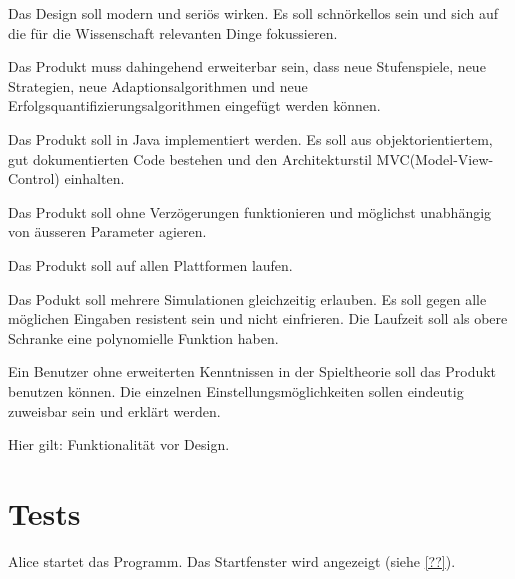 \documentclass[parskip=full,11pt]{scrartcl}
\begin{document}

Das Design soll modern und seriös wirken. Es soll schnörkellos sein und sich auf die für die Wissenschaft relevanten Dinge fokussieren.


Das Produkt muss dahingehend erweiterbar sein,
dass neue Stufenspiele, neue Strategien, neue Adaptionsalgorithmen und neue Erfolgsquantifizierungsalgorithmen eingefügt werden können.


Das Produkt soll in Java implementiert werden. Es soll aus objektorientiertem, gut dokumentierten Code bestehen und den Architekturstil MVC(Model-View-Control) einhalten.


Das Produkt soll ohne Verzögerungen funktionieren und möglichst unabhängig von äusseren Parameter agieren.


Das Produkt soll auf allen Plattformen laufen.


Das Podukt soll mehrere Simulationen gleichzeitig erlauben. Es soll gegen alle möglichen Eingaben resistent sein und nicht einfrieren.
Die Laufzeit soll als obere Schranke eine polynomielle Funktion haben.


Ein Benutzer ohne erweiterten Kenntnissen in der Spieltheorie soll das Produkt benutzen können.
Die einzelnen Einstellungsmöglichkeiten sollen eindeutig zuweisbar sein und erklärt werden. 

Hier gilt: Funktionalität vor Design. 

\section{Tests}


{Alice startet das Programm.}
{Das Startfenster wird angezeigt (siehe \cref{??}).}
\end{document}
